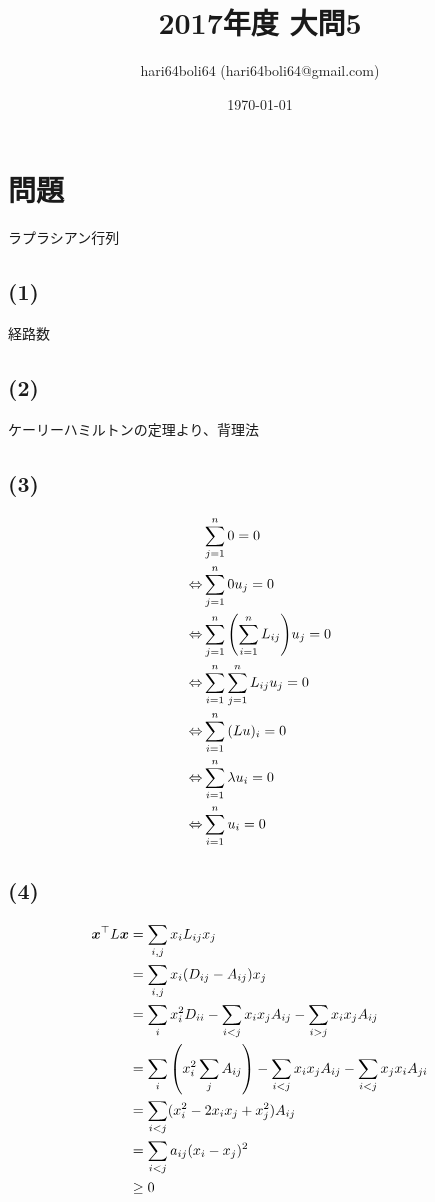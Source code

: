 \documentclass[a4paper, 10pt, dvipdfmx]{jlreq}
\begin{document}
\title{2017年度 大問5}
\author{hari64boli64 (hari64boli64@gmail.com)}
\date{\today}
\maketitle

\section{問題}

ラプラシアン行列

\subsection*{(1)}
経路数

\subsection*{(2)}
ケーリーハミルトンの定理より、背理法

\subsection*{(3)}
\begin{align*}
                  & \sum_{j=1}^{n}{0}=0                             \\
  \Leftrightarrow & \sum_{j=1}^{n}{0u_j}=0                          \\
  \Leftrightarrow & \sum_{j=1}^{n}\qty(\sum_{i=1}^{n}{L_{ij}})u_j=0 \\
  \Leftrightarrow & \sum_{i=1}^{n}\sum_{j=1}^{n}{L_{ij}u_j}=0       \\
  \Leftrightarrow & \sum_{i=1}^{n}{(Lu)_i}=0                        \\
  \Leftrightarrow & \sum_{i=1}^{n}{\lambda u_i}=0                   \\
  \Leftrightarrow & \sum_{i=1}^{n}{u_i}=0
\end{align*}

\subsection*{(4)}
\begin{align*}
  \bm{x}^\top  L \bm{x} & =\sum_{i,j}x_i L_{ij} x_j                                                                \\
                        & =\sum_{i,j}x_i (D_{ij}-A_{ij}) x_j                                                       \\
                        & =\sum_{i}x_i^2 D_{ii}-\sum_{i<j}x_i x_j A_{ij}- \sum_{i>j}x_i x_j A_{ij}                 \\
                        & =\sum_{i}\qty(x_i^2 \sum_{j}{A_{ij}})-\sum_{i<j}x_i x_j A_{ij}- \sum_{i<j}x_j x_i A_{ji} \\
                        & =\sum_{i<j}(x_i^2 -2x_i x_j +x_j^2) A_{ij}                                               \\
                        & =\sum_{i<j}a_{ij}(x_i -x_j)^2                                                            \\
                        & \geq 0
\end{align*}
\end{document}
